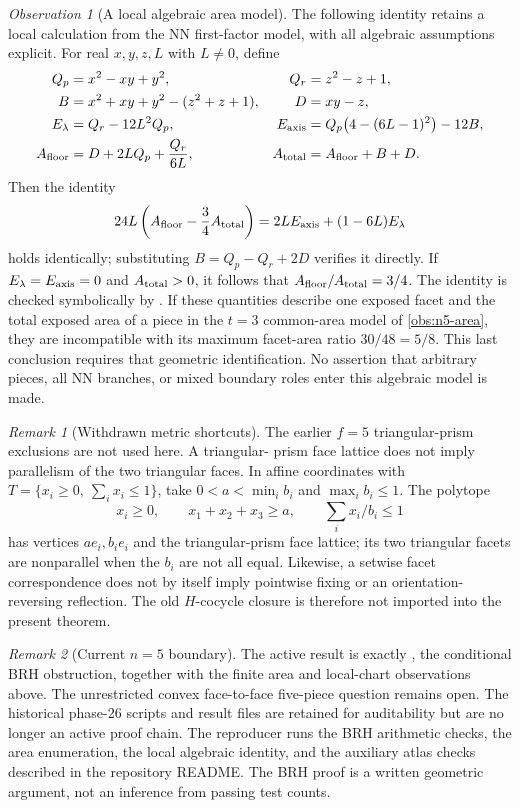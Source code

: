 \documentclass[11pt,a4paper]{article}
\theoremstyle{plain}
\theoremstyle{definition}
\theoremstyle{remark}
\newtheorem{remark}[remark]{Remark}
\newtheorem{observation}[observation]{Observation}
\begin{document}
\begin{observation}[A local algebraic area model]\label{obs:n5-nn}
The following identity retains a local calculation from the NN first-factor
model, with all algebraic assumptions explicit.  For real $x,y,z,L$ with
$L\ne0$, define
\begin{align*}
 Q_p&=x^2-xy+y^2, & Q_r&=z^2-z+1,\\
 B&=x^2+xy+y^2-(z^2+z+1), & D&=xy-z,\\
 E_\lambda&=Q_r-12L^2Q_p, &
 E_{\rm axis}&=Q_p\bigl(4-(6L-1)^2\bigr)-12B,\\
 A_{\rm floor}&=D+2LQ_p+\frac{Q_r}{6L}, &
 A_{\rm total}&=A_{\rm floor}+B+D.
\end{align*}
Then the identity
\[
 24L\left(A_{\rm floor}-\frac34A_{\rm total}\right)
 =2L E_{\rm axis}+(1-6L)E_\lambda
\]
holds identically; substituting $B=Q_p-Q_r+2D$ verifies it directly.
If $E_\lambda=E_{\rm axis}=0$ and $A_{\rm total}>0$, it follows that
$A_{\rm floor}/A_{\rm total}=3/4$.  The identity is checked symbolically by
.
If these quantities describe one exposed facet and the total exposed area
of a piece in the $t=3$ common-area model of \cref{obs:n5-area}, they are
incompatible with its maximum facet-area ratio $30/48=5/8$.
This last conclusion requires that geometric identification.  No assertion
that arbitrary pieces, all NN branches, or mixed boundary roles enter this
algebraic model is made.
\end{observation}

\begin{remark}[Withdrawn metric shortcuts]
The earlier $f=5$ triangular-prism exclusions are not used here.  A triangular-
prism face lattice does not imply parallelism of the two triangular faces.
In affine coordinates with $T=\{x_i\ge0,\ \sum_i x_i\le1\}$, take
$0<a<\min_i b_i$ and $\max_i b_i\le1$.  The polytope
\[
 x_i\ge0,\qquad x_1+x_2+x_3\ge a,\qquad
 \sum_i x_i/b_i\le1
\]
has vertices $ae_i,b_ie_i$ and the triangular-prism face lattice; its two
triangular facets are nonparallel when the $b_i$ are not all equal.
Likewise, a setwise facet correspondence does
not by itself imply pointwise fixing or an orientation-reversing reflection.
The old $H$-cocycle closure is therefore not imported into the present theorem.
\end{remark}

\begin{remark}[Current $n=5$ boundary]
The active result is exactly , the conditional BRH obstruction,
together with the finite area and local-chart observations above.  The
unrestricted convex face-to-face five-piece question remains open.  The
historical phase-26 scripts and result files are retained for auditability but
are no longer an active proof chain.  The reproducer runs the BRH arithmetic
checks, the area enumeration, the local algebraic identity, and the auxiliary
atlas checks described in the repository README.  The BRH proof is a written
geometric argument, not an inference from passing test counts.
\end{remark}
\end{document}
